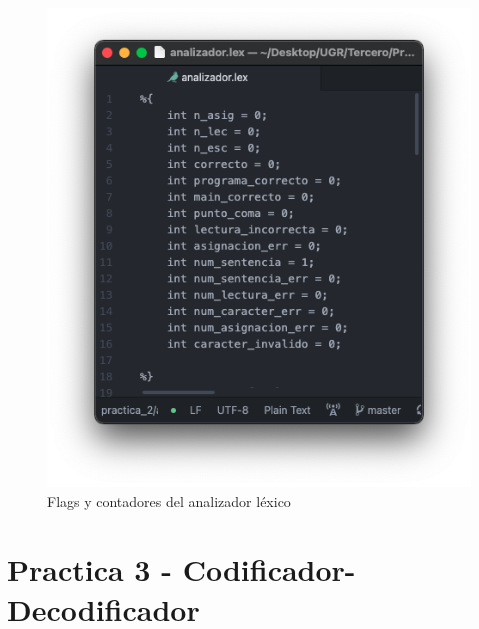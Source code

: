 \begin{figure}[H] 
	\centering
	\includegraphics[scale=0.5]{../practica_2/images/variables.png} 
	\caption{Flags y contadores del analizador léxico} 
    \label{fig:variables}
\end{figure}

\newpage
\section{Practica 3 - Codificador-Decodificador}



